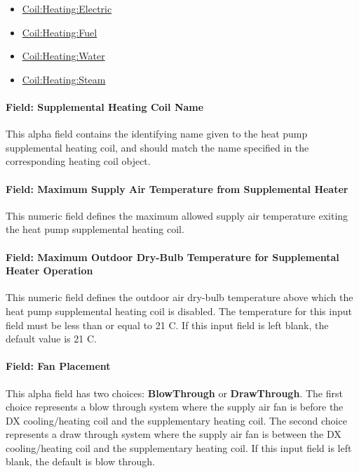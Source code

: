 \begin{itemize}
\item
  \hyperref[coilheatingelectric]{Coil:Heating:Electric}
\item
  \hyperref[coilheatinggas-000]{Coil:Heating:Fuel}
\item
  \hyperref[coilheatingwater]{Coil:Heating:Water}
\item
  \hyperref[coilheatingsteam]{Coil:Heating:Steam}
\end{itemize}

\paragraph{Field: Supplemental Heating Coil Name}\label{field-supplemental-heating-coil-name-1}

This alpha field contains the identifying name given to the heat pump supplemental heating coil, and should match the name specified in the corresponding heating coil object.

\paragraph{Field: Maximum Supply Air Temperature from Supplemental Heater}\label{field-maximum-supply-air-temperature-from-supplemental-heater}

This numeric field defines the maximum allowed supply air temperature exiting the heat pump supplemental heating coil.

\paragraph{Field: Maximum Outdoor Dry-Bulb Temperature for Supplemental Heater Operation}\label{field-maximum-outdoor-dry-bulb-temperature-for-supplemental-heater-operation-1}

This numeric field defines the outdoor air dry-bulb temperature above which the heat pump supplemental heating coil is disabled. The temperature for this input field must be less than or equal to 21 C. If this input field is left blank, the default value is 21 C.

\paragraph{Field: Fan Placement}\label{field-fan-placement-3}

This alpha field has two choices: \textbf{BlowThrough} or \textbf{DrawThrough}. The first choice represents a blow through system where the supply air fan is before the DX cooling/heating coil and the supplementary heating coil. The second choice represents a draw through system where the supply air fan is between the DX cooling/heating coil and the supplementary heating coil. If this input field is left blank, the default is blow through.

